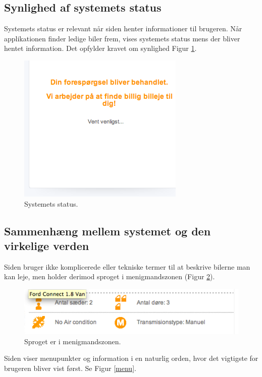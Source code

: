 \documentclass[a4paper]{article}
\begin{document}
\subsection{Synlighed af systemets status}
Systemets status er relevant når siden henter informationer til brugeren. Når
applikationen finder ledige biler frem, vises systemets status mens der bliver
hentet information. Det opfylder kravet om synlighed Figur \ref{status}.

\begin{figure}[htbp]
  \begin{center}
    \includegraphics[scale=.6]{4.png}
  \end{center}
  \caption{Systemets status.}
  \label{status}
\end{figure}

\subsection{Sammenhæng mellem systemet og den virkelige verden}
Siden bruger ikke komplicerede eller tekniske termer til at beskrive bilerne man
kan leje, men holder derimod sproget i menigmandszonen (Figur \ref{sprog}).

\begin{figure}[htbp]
  \begin{center}
    \includegraphics[scale=.6]{5.png}
  \end{center}
  \caption{Sproget er i menigmandszonen.}
  \label{sprog}
\end{figure}

Siden viser menupunkter og information i en naturlig orden, hvor det vigtigste
for brugeren bliver vist først. Se Figur \ref{menu}.
\end{document}
